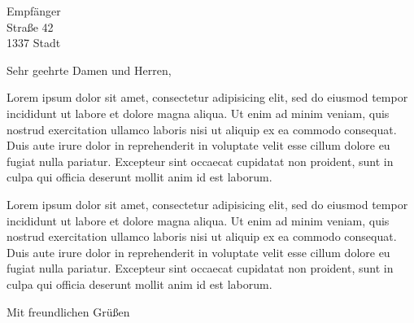 \documentclass[bvv-letter-structure,bvv-letter-column]{scrlttr2}
\begin{document}
\begin{letter}{Empfänger\\Straße 42\\1337 Stadt}
	\opening{Sehr geehrte Damen und Herren,}
	
	Lorem ipsum dolor sit amet, consectetur adipisicing elit, sed do eiusmod tempor incididunt ut labore et dolore magna aliqua. Ut enim ad minim veniam, quis nostrud exercitation ullamco laboris nisi ut aliquip ex ea commodo consequat. Duis aute irure dolor in reprehenderit in voluptate velit esse cillum dolore eu fugiat nulla pariatur. Excepteur sint occaecat cupidatat non proident, sunt in culpa qui officia deserunt mollit anim id est laborum.
	
	Lorem ipsum dolor sit amet, consectetur adipisicing elit, sed do eiusmod tempor incididunt ut labore et dolore magna aliqua. Ut enim ad minim veniam, quis nostrud exercitation ullamco laboris nisi ut aliquip ex ea commodo consequat. Duis aute irure dolor in reprehenderit in voluptate velit esse cillum dolore eu fugiat nulla pariatur. Excepteur sint occaecat cupidatat non proident, sunt in culpa qui officia deserunt mollit anim id est laborum.

	\closing{Mit freundlichen Grüßen}
\end{letter}
\end{document}
